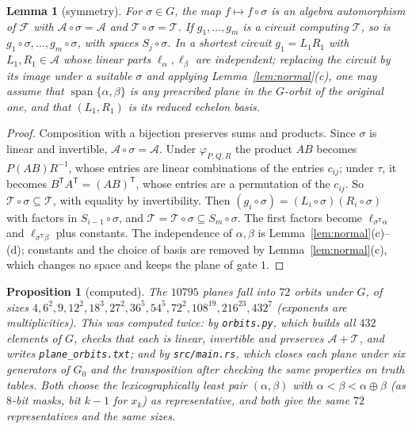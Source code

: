 \documentclass[11pt,a4paper]{article}
\newtheorem{lemma}[theorem]{Lemma}
\newtheorem{proposition}[theorem]{Proposition}
\theoremstyle{definition}
\newcommand{\Fn}{\mathcal{F}}
\newcommand{\Aff}{\mathcal{A}}
\newcommand{\Tg}{\mathcal{T}}
\newcommand{\spn}{\operatorname{span}}
\newcommand{\code}[1]{\texttt{#1}}
\begin{document}
\begin{lemma}[symmetry]\label{lem:sym}
For $\sigma\in G$, the map $f\mapsto f\circ\sigma$ is an algebra automorphism of $\Fn$ with $\Aff\circ\sigma=\Aff$ and $\Tg\circ\sigma=\Tg$. If $g_1,\dots,g_m$ is a circuit computing $\Tg$, so is $g_1\circ\sigma,\dots,g_m\circ\sigma$, with spaces $S_j\circ\sigma$. In a shortest circuit $g_1=L_1R_1$ with $L_1,R_1\in\Aff$ whose linear parts $\ell_\alpha,\ell_\beta$ are independent; replacing the circuit by its image under a suitable $\sigma$ and applying Lemma~\ref{lem:normal}(c), one may assume that $\spn\{\alpha,\beta\}$ is any prescribed plane in the $G$-orbit of the original one, and that $(L_1,R_1)$ is its reduced echelon basis.
\end{lemma}

\begin{proof}
Composition with a bijection preserves sums and products. Since $\sigma$ is linear and invertible, $\Aff\circ\sigma=\Aff$. Under $\varphi_{P,Q,R}$ the product $AB$ becomes $P(AB)R^{-1}$, whose entries are linear combinations of the entries $c_{ij}$; under $\tau$, it becomes $B^{\mathsf T}A^{\mathsf T}=(AB)^{\mathsf T}$, whose entries are a permutation of the $c_{ij}$. So $\Tg\circ\sigma\subseteq\Tg$, with equality by invertibility. Then $(g_i\circ\sigma)=(L_i\circ\sigma)(R_i\circ\sigma)$ with factors in $S_{i-1}\circ\sigma$, and $\Tg=\Tg\circ\sigma\subseteq S_m\circ\sigma$. The first factors become $\ell_{\sigma^{\mathsf T}\alpha}$ and $\ell_{\sigma^{\mathsf T}\beta}$ plus constants. The independence of $\alpha,\beta$ is Lemma~\ref{lem:normal}(c)--(d); constants and the choice of basis are removed by Lemma~\ref{lem:normal}(c), which changes no space and keeps the plane of gate $1$.
\end{proof}

\begin{proposition}[computed]\label{prop:orbits}
The $10795$ planes fall into $72$ orbits under $G$, of sizes $4,6^2,9,12^2,18^3,27^2,36^5,54^5,72^2,108^{19},216^{23},432^7$ (exponents are multiplicities). This was computed twice: by \code{orbits.py}, which builds all $432$ elements of $G$, checks that each is linear, invertible and preserves $\Aff+\Tg$, and writes \code{plane\_orbits.txt}; and by \code{src/main.rs}, which closes each plane under six generators of $G_0$ and the transposition after checking the same properties on truth tables. Both choose the lexicographically least pair $(\alpha,\beta)$ with $\alpha<\beta<\alpha\oplus\beta$ (as $8$-bit masks, bit $k-1$ for $x_k$) as representative, and both give the same $72$ representatives and the same sizes.
\end{proposition}
\end{document}
